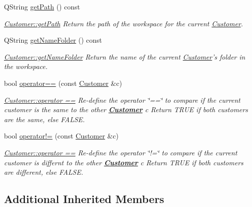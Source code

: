 \begin{DoxyCompactItemize}
Q\-String \hyperlink{classModels_1_1Customer_ac1aec0fb9058333e1a2496b1c29049af}{get\-Path} () const 
\begin{DoxyCompactList}\small\item\em \hyperlink{classModels_1_1Customer_ac1aec0fb9058333e1a2496b1c29049af}{Customer\-::get\-Path} Return the path of the workspace for the current \hyperlink{classModels_1_1Customer}{Customer}. \end{DoxyCompactList}\item 
Q\-String \hyperlink{classModels_1_1Customer_ab7c63946125a6b8d876f0f4e2b50c97e}{get\-Name\-Folder} () const 
\begin{DoxyCompactList}\small\item\em \hyperlink{classModels_1_1Customer_ab7c63946125a6b8d876f0f4e2b50c97e}{Customer\-::get\-Name\-Folder} Return the name of the current \hyperlink{classModels_1_1Customer}{Customer}'s folder in the workspace. \end{DoxyCompactList}\item 
bool \hyperlink{classModels_1_1Customer_ab379700fa93f5b9eb0f8546b03aff70f}{operator==} (const \hyperlink{classModels_1_1Customer}{Customer} \&c)
\begin{DoxyCompactList}\small\item\em \hyperlink{classModels_1_1Customer_ab379700fa93f5b9eb0f8546b03aff70f}{Customer\-::operator ==} Re-\/define the operator \char`\"{}==\char`\"{} to compare if the current customer is the same to the other {\bfseries \hyperlink{classModels_1_1Customer}{Customer}} {\itshape c} Return T\-R\-U\-E if both customers are the same, else F\-A\-L\-S\-E. \end{DoxyCompactList}\item 
bool \hyperlink{classModels_1_1Customer_a07e61dd9ad79b6be765ea1dabccf1e18}{operator!=} (const \hyperlink{classModels_1_1Customer}{Customer} \&c)
\begin{DoxyCompactList}\small\item\em \hyperlink{classModels_1_1Customer_ab379700fa93f5b9eb0f8546b03aff70f}{Customer\-::operator ==} Re-\/define the operator \char`\"{}!=\char`\"{} to compare if the current customer is differnt to the other {\bfseries \hyperlink{classModels_1_1Customer}{Customer}} {\itshape c} Return T\-R\-U\-E if both customers are different, else F\-A\-L\-S\-E. \end{DoxyCompactList}\end{DoxyCompactItemize}
\subsection*{Additional Inherited Members}


